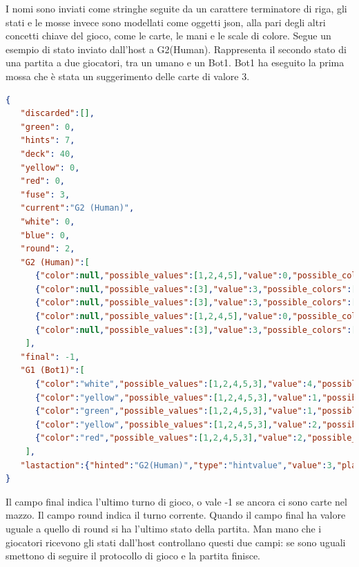 \documentclass{article}
\begin{document}
\begin{flushleft}
I nomi sono inviati come stringhe seguite da un carattere terminatore di riga, gli stati e le mosse invece sono modellati come oggetti json, alla pari degli altri concetti chiave del gioco, come le carte, le mani e le scale di colore.\newline
\newline
Segue un esempio di stato inviato dall'host a G2(Human). Rappresenta il secondo stato di una partita a due giocatori, tra un umano e un Bot1. Bot1 ha eseguito la prima mossa che è stata un suggerimento delle carte di valore 3.
\newline
\small
\begin{lstlisting}[language=json,firstnumber=1]
{
   "discarded":[],
   "green": 0,
   "hints": 7,
   "deck": 40,
   "yellow": 0,
   "red": 0,
   "fuse": 3,
   "current":"G2 (Human)",
   "white": 0,
   "blue": 0,
   "round": 2,
   "G2 (Human)":[
      {"color":null,"possible_values":[1,2,4,5],"value":0,"possible_colors":["red","green","white","blue","yellow"]},
      {"color":null,"possible_values":[3],"value":3,"possible_colors":["red","green","white","blue","yellow"]},
      {"color":null,"possible_values":[3],"value":3,"possible_colors":["red","green","white","blue","yellow"]},
      {"color":null,"possible_values":[1,2,4,5],"value":0,"possible_colors":["red","green","white","blue","yellow"]},
      {"color":null,"possible_values":[3],"value":3,"possible_colors":["red","green","white","blue","yellow"]}
    ],
   "final": -1,
   "G1 (Bot1)":[
      {"color":"white","possible_values":[1,2,4,5,3],"value":4,"possible_colors":["red","green","white","blue","yellow"]},
      {"color":"yellow","possible_values":[1,2,4,5,3],"value":1,"possible_colors":["red","green","white","blue","yellow"]},
      {"color":"green","possible_values":[1,2,4,5,3],"value":1,"possible_colors":["red","green","white","blue","yellow"]},
      {"color":"yellow","possible_values":[1,2,4,5,3],"value":2,"possible_colors":["red","green","white","blue","yellow"]},
      {"color":"red","possible_values":[1,2,4,5,3],"value":2,"possible_colors":["red","green","white","blue","yellow"]}
    ],
   "lastaction":{"hinted":"G2(Human)","type":"hintvalue","value":3,"player":"G1(Bot1)"}
}
\end{lstlisting}
\normalsize
Il campo final indica l'ultimo turno di gioco, o vale -1 se ancora ci sono carte nel mazzo. Il campo round indica il turno corrente. Quando il campo final ha valore uguale a quello di round si ha l'ultimo stato della partita. Man mano che i giocatori ricevono gli stati dall'host controllano questi due campi: se sono uguali smettono di seguire il protocollo di gioco e la partita finisce. \newline

\end{flushleft}
\end{document}
